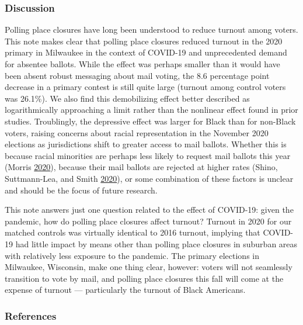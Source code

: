 \documentclass[
  12pt,
]{article}
\begin{document}
\hypertarget{discussion}{%
\subsubsection*{Discussion}\label{discussion}}

Polling place closures have long been understood to reduce turnout among voters. This note makes clear that polling place closures reduced turnout in the 2020 primary in Milwaukee in the context of COVID-19 and unprecedented demand for absentee ballots. While the effect was perhaps smaller than it would have been absent robust messaging about mail voting, the 8.6 percentage point decrease in a primary contest is still quite large (turnout among control voters was 26.1\%). We also find this demobilizing effect better described as logarithmically approaching a limit rather than the nonlinear effect found in prior studies. Troublingly, the depressive effect was larger for Black than for non-Black voters, raising concerns about racial representation in the November 2020 elections as jurisdictions shift to greater access to mail ballots. Whether this is because racial minorities are perhaps less likely to request mail ballots this year (Morris \protect\hyperlink{ref-Morris2020}{2020}), because their mail ballots are rejected at higher rates (Shino, Suttmann-Lea, and Smith \protect\hyperlink{ref-Shino2020}{2020}), or some combination of these factors is unclear and should be the focus of future research.

This note answers just one question related to the effect of COVID-19: given the pandemic, how do polling place closures affect turnout? Turnout in 2020 for our matched controls was virtually identical to 2016 turnout, implying that COVID-19 had little impact by means other than polling place closures in suburban areas with relatively less exposure to the pandemic. The primary elections in Milwaukee, Wisconsin, make one thing clear, however: voters will not seamlessly transition to vote by mail, and polling place closures this fall will come at the expense of turnout --- particularly the turnout of Black Americans.

\newpage

\hypertarget{references}{%
\subsubsection*{References}\label{references}}
\end{document}

